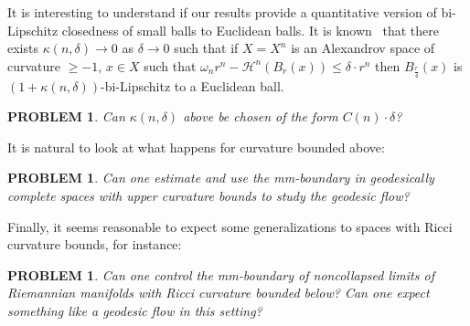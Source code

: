 \documentclass[12pt,leqno,intlimits]{amsart}
\numberwithin{equation}{section}
\newtheorem{quest}[thm]{PROBLEM}
\theoremstyle{definition}
\theoremstyle{remark}
\begin{document}
It is interesting to understand if our results provide a quantitative version of bi-Lipschitz closedness of small balls to Euclidean balls. It is known~\cite{BGP} that there exists $\kappa(n,\delta)\to 0$ as $\delta\to 0$ such that if $X=X^n$ is an Alexandrov space of curvature $\ge -1$, $x\in X$ such that $\omega _n r^n -\mathcal H^n (B_r (x)) \leq \delta \cdot r ^n$ then $B_{\frac r 4} (x)$ is $(1+\kappa(n,\delta))$-bi-Lipschitz to a Euclidean ball.
\begin{quest}
Can $\kappa(n,\delta)$ above be chosen 
of the form $C(n)\cdot \delta$? 
\end{quest}

It is natural to look at what happens for curvature bounded above:

\begin{quest} \label{qe:CAT}
Can one estimate and use the mm-boundary in geodesically complete spaces with upper curvature bounds to study the geodesic flow?
\end{quest}

Finally, it seems reasonable to expect some generalizations to spaces with Ricci curvature bounds, for instance:

\begin{quest}
Can one control the mm-boundary of noncollapsed limits of Riemannian manifolds with Ricci curvature bounded below? Can one expect something like a geodesic flow in this setting?
\end{quest}
\end{document}
